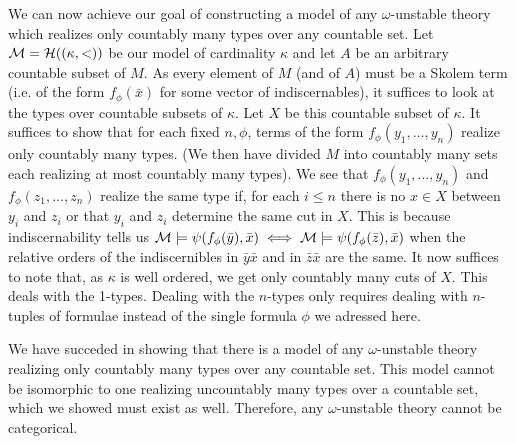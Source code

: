 We can now achieve our goal of constructing a model of any \(\omega\)-unstable theory which realizes only countably many types over any countable set. 
Let \(\mathcal{M} = \mathcal{H}((\kappa, <))\) be our model of cardinality \(\kappa\) and let \(A\) be an arbitrary countable subset of \(M\). %
As every element of \(M\) (and of \(A\)) must be a Skolem term (i.e. of the form \(f_\phi(\bar{x})\) for some vector of indiscernables), it suffices to look at the types over countable subsets of \(\kappa\).
Let \(X\) be this countable subset of \(\kappa\). 
It suffices to show that for each fixed \(n, \phi\), terms of the form \(f_\phi(y_1, \ldots, y_n)\) realize only countably many types. 
(We then have divided \(M\) into countably many sets each realizing at most countably many types).
We see that \(f_\phi(y_1, \ldots, y_n)\) and \(f_\phi(z_1, \ldots, z_n)\) realize the same type if, for each \(i \leq n\) there is no \(x \in X\) between \(y_i\) and \(z_i\) or that \(y_i\) and \(z_i\) determine the same cut in \(X\).  
This is because indiscernability tells us \(\mathcal{M} \models \psi(f_\phi(\bar{y}), \bar{x}) \iff \mathcal{M} \models \psi(f_\phi(\bar{z}), \bar{x})\) when the relative orders of the indiscernibles in \(\bar{y}\bar{x}\) and in \(\bar{z}\bar{x}\) are the same. 
It now suffices to note that, as \(\kappa\) is well ordered, we get only countably many cuts of \(X\). 
This deals with the 1-types. Dealing with the \(n\)-types only requires dealing with \(n\)-tuples of formulae instead of the single formula \(\phi\) we adressed here. 

We have succeded in showing that there is a model of any \(\omega\)-unstable theory realizing only countably many types over any countable set.
This model cannot be isomorphic to one realizing uncountably many types over a countable set, which we showed must exist as well. 
Therefore, any \(\omega\)-unstable theory cannot be categorical. %
